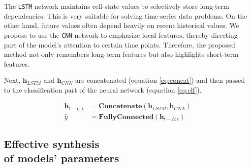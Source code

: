 \documentclass[aps,prb,groupedaddress,twocolumn,showpacs,dvipdfmx,superscriptaddress,pdftex]{revtex4-2}
\begin{document}
\vspace{2mm}


The \verb|LSTM| network maintains cell-state values to selectively store long-term dependencies. This is very suitable for solving time-series data problems. On the other hand, future values often depend heavily on recent historical values. We propose to use the \verb|CNN| network to emphasize local features, thereby directing part of the model's attention to certain time points. Therefore, the proposed method not only remembers long-term features but also highlights short-term features.

\vspace{2mm}


Next, $\mathbf{h}_{LSTM}$ and $\mathbf{h}_{CNN}$ are concatenated (equation \ref{eq:concat}) and then passed to the classification part of the neural network (equation \ref{eq:clf}).

\begin{align}
    \mathbf{h}_{t-L:t} &= \mathbf{Concatenate}\left( \mathbf{h}_{LSTM}, \mathbf{h}_{CNN} \right) \label{eq:concat} \\
    \hat y &= \mathbf{FullyConnected}\left( \mathbf{h}_{t-L:t} \right) \label{eq:clf}
\end{align}

\subsection{Effective synthesis\\of models' parameters}

\end{document}
